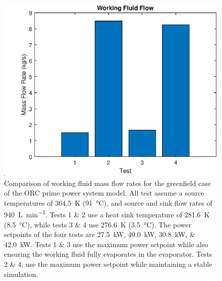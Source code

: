 \begin{figure}[h]
	\centering

	\includegraphics[width=\textwidth]{figures/gfFlow}

	\caption{Comparison of working fluid mass flow rates for the greenfield case of the ORC prime power system model. All test assume a source temperatures of \SI{364.5}{\kelvin} (\SI{91}{\degreeCelsius}), and source and sink flow rates of \SI{940}{\liter\per\minute}. Tests 1 \& 2 use a heat sink temperature of \SI{281.6}{\kelvin} (\SI{8.5}{\degreeCelsius}), while tests 3 \& 4 use \SI{276.6}{\kelvin} (\SI{3.5}{\degreeCelsius}). The power setpoints of the four tests are \SIlist{27.5;40.0;30.8;42.0}{\kilo\watt}. Tests 1 \& 3 use the maximum power setpoint while also ensuring the working fluid fully evaporates in the evaporator. Tests 2 \& 4, use the maximum power setpoint while maintaining a stable simulation. }
	\label{fig:gfFlow}
\end{figure}
